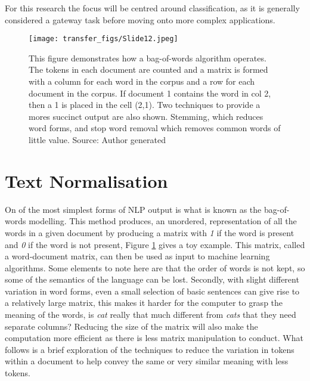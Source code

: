 For this research the focus will be centred around classification, as it is generally considered a gateway task before moving onto more complex applications.


\begin{figure}
  \texttt{[image: transfer\_figs/Slide12.jpeg]}
  \caption[Bag-of-Words Example.]{This figure demonstrates how a bag-of-words algorithm operates. The tokens in each document are counted and a matrix is formed with a column for each word in the corpus and a row for each document in the corpus. If document 1 contains the word in col 2, then a 1 is placed in the cell (2,1). Two techniques to provide a mores succinct output are also shown. Stemming, which reduces word forms, and stop word removal which removes common words of little value. Source: Author generated}
  \label{fig:BOW}
\end{figure}

\section{Text Normalisation} On of the most simplest forms of NLP output is what is known as the bag-of-words modelling. This method produces, an unordered, representation of all the words in a given document by producing a matrix with \emph{1} if the word is present and \emph{0} if the word is not present, Figure \ref{fig:BOW} gives a toy example. This matrix, called a word-document matrix, can then be used as input to machine learning algorithms. Some elements to note here are that the order of words is not kept, so some of the semantics of the language can be lost. Secondly, with slight different variation in word forms, even a small selection of basic sentences can give rise to a relatively large matrix, this makes it harder for the computer to grasp the meaning of the words, is \emph{cat} really that much different from \emph{cats} that they need separate columns? Reducing the size of the matrix will also make the computation more efficient as there is less matrix manipulation to conduct. What follows is a brief exploration of the techniques to reduce the variation in tokens within a document to help convey the same or very similar meaning with less tokens.

